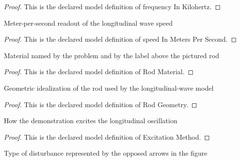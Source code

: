 \begin{proof}
  This is the declared model definition of frequency In Kilohertz.
\end{proof}
\begin{definition}
  \label{def:physics:phyx-mini-0185:phyxminiproblems-problemphyxmini0185-speedinmeterspersecond}
  Meter-per-second readout of the longitudinal wave speed
\end{definition}
\begin{proof}
  This is the declared model definition of speed In Meters Per Second.
\end{proof}
\begin{definition}
  \label{def:physics:phyx-mini-0185:phyxminiproblems-problemphyxmini0185-rodmaterial}
  Material named by the problem and by the label above the pictured rod
\end{definition}
\begin{proof}
  This is the declared model definition of Rod Material.
\end{proof}
\begin{definition}
  \label{def:physics:phyx-mini-0185:phyxminiproblems-problemphyxmini0185-rodgeometry}
  Geometric idealization of the rod used by the longitudinal-wave model
\end{definition}
\begin{proof}
  This is the declared model definition of Rod Geometry.
\end{proof}
\begin{definition}
  \label{def:physics:phyx-mini-0185:phyxminiproblems-problemphyxmini0185-excitationmethod}
  How the demonstration excites the longitudinal oscillation
\end{definition}
\begin{proof}
  This is the declared model definition of Excitation Method.
\end{proof}
\begin{definition}
  \label{def:physics:phyx-mini-0185:phyxminiproblems-problemphyxmini0185-rodwavekind}
  Type of disturbance represented by the opposed arrows in the figure
\end{definition}
